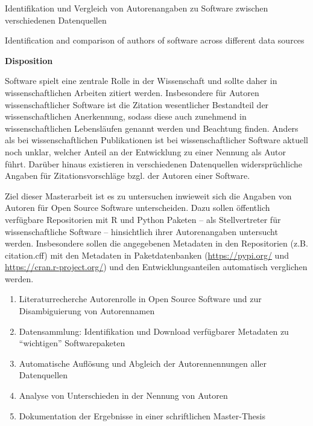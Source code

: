 Identifikation und Vergleich von Autorenangaben zu Software zwischen verschiedenen Datenquellen

\noindent\makebox[\linewidth]{\rule{\linewidth}{0.4pt}}
Identification and comparison of authors of software across different data sources

\noindent\makebox[\linewidth]{\rule{\linewidth}{0.4pt}}

\textbf{Disposition}
\vspace*{.1cm}

Software spielt eine zentrale Rolle in der Wissenschaft und sollte daher in wissenschaftlichen Arbeiten zitiert werden.
Insbesondere für Autoren wissenschaftlicher Software ist die Zitation wesentlicher Bestandteil der wissenschaftlichen Anerkennung, sodass diese auch zunehmend in wissenschaftlichen Lebensläufen genannt werden und Beachtung finden.
Anders als bei wissenschaftlichen Publikationen ist bei wissenschaftlicher Software aktuell noch unklar, welcher Anteil an der Entwicklung zu einer Nennung als Autor führt.
Darüber hinaus existieren in verschiedenen Datenquellen widersprüchliche Angaben für Zitationsvorschläge bzgl. der Autoren einer Software.

Ziel dieser Masterarbeit ist es zu untersuchen inwieweit sich die Angaben von Autoren für Open Source Software unterscheiden. 
Dazu sollen öffentlich verfügbare Repositorien mit R und Python Paketen -- als Stellvertreter für wissenschaftliche Software -- hinsichtlich ihrer Autorenangaben untersucht werden.
Insbesondere sollen die angegebenen Metadaten in den Repositorien (z.B. citation.cff) mit den Metadaten in Paketdatenbanken (\url{https://pypi.org/} und \url{https://cran.r-project.org/}) und den Entwicklungsanteilen automatisch verglichen werden.

\begin{enumerate}
    \item Literaturrecherche Autorenrolle in Open Source Software und zur Disambiguierung von Autorennamen 
    \item Datensammlung: Identifikation und Download verfügbarer Metadaten zu \enquote{wichtigen} Softwarepaketen
    \item Automatische Auflösung und Abgleich der Autorennennungen aller Datenquellen
    \item Analyse von Unterschieden in der Nennung von Autoren
    \item Dokumentation der Ergebnisse in einer schriftlichen Master-Thesis
\end{enumerate}
